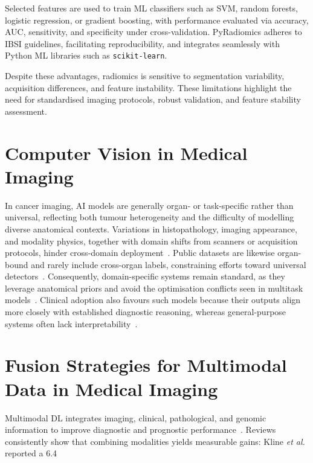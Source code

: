Selected features are used to train ML classifiers such as SVM, random forests, logistic regression, or gradient boosting, with performance evaluated via accuracy, AUC, sensitivity, and specificity under cross-validation. PyRadiomics adheres to IBSI guidelines, facilitating reproducibility, and integrates seamlessly with Python ML libraries such as \texttt{scikit-learn}.

Despite these advantages, radiomics is sensitive to segmentation variability, acquisition differences, and feature instability. These limitations highlight the need for standardised imaging protocols, robust validation, and feature stability assessment.

\section{Computer Vision in Medical Imaging}
In cancer imaging, AI models are generally organ- or task-specific rather than universal, reflecting both tumour heterogeneity and the difficulty of modelling diverse anatomical contexts. Variations in histopathology, imaging appearance, and modality physics, together with domain shifts from scanners or acquisition protocols, hinder cross-domain deployment~\cite{bian2025artificial,ma2024segment,guan2021domain,koh2022artificial}. Public datasets are likewise organ-bound and rarely include cross-organ labels, constraining efforts toward universal detectors~\cite{wei2025multicenter,ali2021state}. Consequently, domain-specific systems remain standard, as they leverage anatomical priors and avoid the optimisation conflicts seen in multitask models~\cite{bian2025artificial,guan2021domain}. Clinical adoption also favours such models because their outputs align more closely with established diagnostic reasoning, whereas general-purpose systems often lack interpretability~\cite{ma2024segment,zhang2024challenges}.



\section{Fusion Strategies for Multimodal Data in Medical Imaging}

Multimodal DL integrates imaging, clinical, pathological, and genomic information to improve diagnostic and prognostic performance~\cite{huang2020fusion,mohsen2022artificial}. Reviews consistently show that combining modalities yields measurable gains: Kline \textit{et al.} reported a 6.4%

